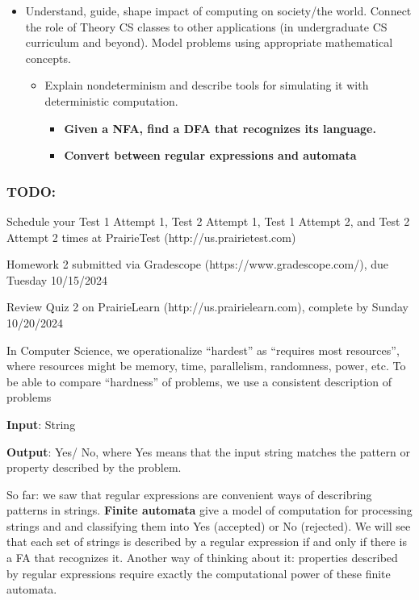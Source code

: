 \begin{itemize}
\item Understand, guide, shape impact of computing on society/the world. Connect the role of Theory CS classes to other applications (in undergraduate CS curriculum and beyond). Model problems using appropriate mathematical concepts.
 \begin{itemize}
     \item Explain nondeterminism and describe tools for simulating it with deterministic computation.
     \begin{itemize}
       \item {\bf Given a NFA, find a DFA that recognizes its language.}
       \item {\bf Convert between regular expressions and automata}
     \end{itemize}
 \end{itemize}

\end{itemize}

\vspace{-20pt}

\subsubsection*{TODO:}
\begin{list}{\itemsep-10pt}
   \item Schedule your Test 1 Attempt 1, Test 2 Attempt 1, Test 1 Attempt 2, and Test 2 Attempt 2 times 
   at PrairieTest (http://us.prairietest.com)
   \item Homework 2 submitted via Gradescope (https://www.gradescope.com/), due Tuesday 10/15/2024
   \item Review Quiz 2 on PrairieLearn (http://us.prairielearn.com), complete by Sunday 10/20/2024
\end{list}

\newpage

In Computer Science, we operationalize ``hardest'' as ``requires most resources'', where
resources might be memory, time, parallelism, randomness, power, etc.
To be able to compare ``hardness'' of problems, we use a consistent description of problems

{\bf Input}: String

{\bf Output}: Yes/ No, where Yes means that the input string matches the pattern or property described by the problem.

So far: we saw that regular expressions are convenient ways of describring patterns in strings.
{\bf Finite automata} give a model of computation for processing strings and and classifying them into Yes (accepted)
or No (rejected). We will see that each set of strings is described by a regular expression if and only 
if there is a FA that recognizes it.  Another way of thinking about it: properties described by regular
expressions require exactly the computational power of these finite automata.

